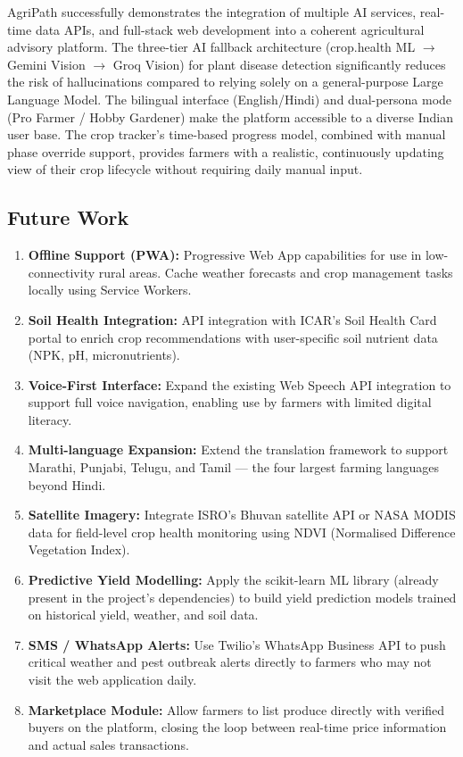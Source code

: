 \documentclass[12pt,a4paper]{article}
\begin{document}
AgriPath successfully demonstrates the integration of multiple AI services, real-time data APIs, and full-stack web development into a coherent agricultural advisory platform. The three-tier AI fallback architecture (crop.health ML $\rightarrow$ Gemini Vision $\rightarrow$ Groq Vision) for plant disease detection significantly reduces the risk of hallucinations compared to relying solely on a general-purpose Large Language Model. The bilingual interface (English/Hindi) and dual-persona mode (Pro Farmer / Hobby Gardener) make the platform accessible to a diverse Indian user base. The crop tracker's time-based progress model, combined with manual phase override support, provides farmers with a realistic, continuously updating view of their crop lifecycle without requiring daily manual input.

\subsection*{Future Work}

\begin{enumerate}
    \item \textbf{Offline Support (PWA):} Progressive Web App capabilities for use in low-connectivity rural areas. Cache weather forecasts and crop management tasks locally using Service Workers.
    \item \textbf{Soil Health Integration:} API integration with ICAR's Soil Health Card portal to enrich crop recommendations with user-specific soil nutrient data (NPK, pH, micronutrients).
    \item \textbf{Voice-First Interface:} Expand the existing Web Speech API integration to support full voice navigation, enabling use by farmers with limited digital literacy.
    \item \textbf{Multi-language Expansion:} Extend the translation framework to support Marathi, Punjabi, Telugu, and Tamil --- the four largest farming languages beyond Hindi.
    \item \textbf{Satellite Imagery:} Integrate ISRO's Bhuvan satellite API or NASA MODIS data for field-level crop health monitoring using NDVI (Normalised Difference Vegetation Index).
    \item \textbf{Predictive Yield Modelling:} Apply the scikit-learn ML library (already present in the project's dependencies) to build yield prediction models trained on historical yield, weather, and soil data.
    \item \textbf{SMS / WhatsApp Alerts:} Use Twilio's WhatsApp Business API to push critical weather and pest outbreak alerts directly to farmers who may not visit the web application daily.
    \item \textbf{Marketplace Module:} Allow farmers to list produce directly with verified buyers on the platform, closing the loop between real-time price information and actual sales transactions.
\end{enumerate}
\end{document}
